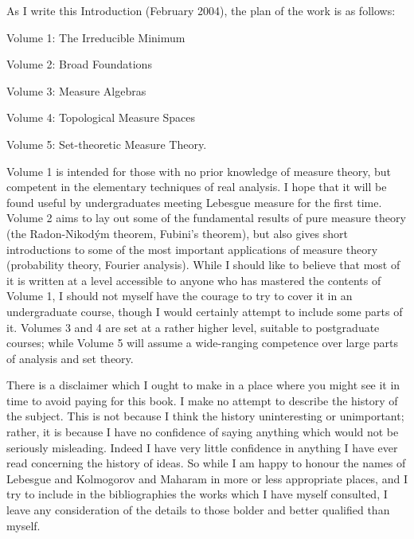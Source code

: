 As I write this Introduction (February 2004), the plan of the work is
as follows:

\medskip

\qquad\qquad Volume 1:  The Irreducible Minimum

\qquad\qquad Volume 2:  Broad Foundations

\qquad\qquad Volume 3:  Measure Algebras

\qquad\qquad Volume 4:  Topological Measure Spaces

\qquad\qquad Volume 5:  Set-theoretic Measure Theory.

\medskip

\noindent Volume 1 is intended for those with no prior knowledge of
measure theory, but competent in the elementary techniques of real
analysis.  I hope that it will be found useful by undergraduates meeting
Lebesgue measure for the first time.    Volume 2 aims to lay out some of
the fundamental results of pure measure theory (the
Radon-Nikod\'ym theorem, Fubini's theorem), but also gives short
introductions to some of the most important applications of measure
theory (probability theory, Fourier analysis).   While I should like to
believe that most of it is written at a level accessible to anyone who
has mastered the contents of Volume 1, I should not myself have the
courage to try to cover it in an undergraduate course, though I would
certainly attempt to include some parts of it.   Volumes 3 and 4 are
set at a rather higher level, suitable to postgraduate courses;  while
Volume 5 will assume a wide-ranging competence over large parts of
analysis and set theory.

There is a disclaimer which I ought to make in a place where you might
see it in time to avoid paying for this book.   I make no attempt to
describe the history of the subject.   This is not because I think the
history uninteresting or unimportant;  rather, it is because I have no
confidence of saying anything which would not be seriously misleading.
Indeed I have very little confidence in anything I have ever read
concerning the history of ideas.   So while I am happy to honour the
names of Lebesgue and Kolmogorov and Maharam in more or less appropriate
places, and I try to include in the bibliographies the works which I
have myself consulted, I leave any consideration of the details to those
bolder and better qualified than myself.

